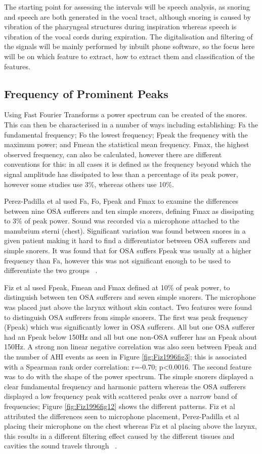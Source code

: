 The starting point for assessing the intervals will be speech analysis, as snoring and speech are both generated in the vocal tract, although snoring is caused by vibration of the pharyngeal structures during inspiration whereas speech is vibration of the vocal cords during expiration. The digitalisation and filtering of the signals will be mainly performed by inbuilt phone software, so the focus here will be on which feature to extract, how to extract them and classification of the features. 

\subsection{Frequency of Prominent Peaks}
Using Fast Fourier Transforms a power spectrum can be created of the snores. This can then be characterised in a number of ways including establishing: Fa the fundamental frequency; Fo the lowest frequency; Fpeak the frequency with the maximum power; and Fmean the statistical mean frequency. Fmax, the highest observed frequency, can also be calculated, however there are different conventions for this: in all cases it is defined as the frequency beyond which the signal amplitude has dissipated to less than a percentage of its peak power, however some studies use 3\%, whereas others use 10\%. 

Perez-Padilla et al used Fa, Fo, Fpeak and Fmax to examine the differences between nine OSA sufferers and ten simple snorers, defining Fmax as dissipating to 3\% of peak power. Sound was recorded via a microphone attached to the manubrium sterni (chest). Significant variation was found between snores in a given patient making it hard to find a differentiator between OSA sufferers and simple snorers. It was found that for OSA suffers Fpeak was usually at a higher frequency than Fa, however this was not significant enough to be used to differentiate the two groups ~\cite{whitelaw1993characteristics}.

Fiz et al used Fpeak, Fmean and Fmax defined at 10\% of peak power, to distinguish between ten OSA sufferers and seven simple snorers. The microphone was placed just above the larynx without skin contact. Two features were found to distinguish OSA sufferers from simple snorers. The first was peak frequency (Fpeak) which was significantly lower in OSA sufferers. All but one OSA sufferer had an Fpeak below 150Hz and all but one non-OSA sufferer has an Fpeak about 150Hz. A strong non linear negative correlation was also seen between Fpeak and the number of AHI events as seen in Figure \ref{fig:Fiz1996fig3}; this is associated with a Spearman rank order correlation: r=-0.70; p\textless0.0016. The second feature was to do with the shape of the power spectrum. The simple snorers displayed a clear fundamental frequency and harmonic pattern whereas the OSA sufferers displayed a low frequency peak with scattered peaks over a narrow band of frequencies; Figure \ref{fig:Fiz1996fig12} shows the different patterns. Fiz et al attributed the differences seen to microphone placement, Perez-Padilla et al placing their microphone on the chest whereas Fiz et al placing above the larynx, this results in a different filtering effect caused by the different tissues and cavities the sound travels through ~\cite{fiz1996acoustic}.

